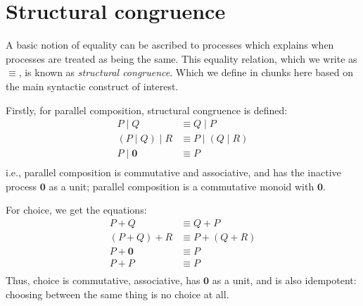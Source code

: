 \documentclass{article}
\theoremstyle{definition}
\begin{document}
\fi

\section{Structural congruence}

A basic notion of equality can be ascribed to processes which explains
when processes are treated as being the same. This equality
relation, which we write as $\equiv$, is known
as  \emph{structural congruence}. Which we define in chunks
here based on the main syntactic construct of interest.

Firstly, for parallel composition, structural congruence is defined:
%
\begin{align*}
  P \mid Q & \equiv Q \mid P \\
    (P \mid Q) \mid R & \equiv P \mid (Q \mid R) \\
    P \mid \mathbf{0} & \equiv P \\
\end{align*}
i.e., parallel composition is commutative and associative,
and has the inactive process $\mathbf{0}$ as a unit;
parallel composition is a commutative monoid with $\mathbf{0}$.

For choice, we get the equations:
%
\begin{align*}
 P + Q & \equiv Q + P \\
(P + Q) + R & \equiv P + (Q + R) \\
 P + \mathbf{0} & \equiv P \\
 P + P & \equiv P \\
\end{align*}
Thus, choice is commutative, associative, has
$\mathbf{0}$ as a unit, and is also idempotent:
choosing between the same thing is no choice at all.
\end{document}
